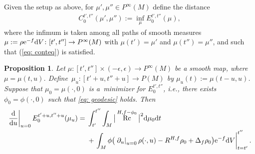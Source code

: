 \documentclass[pdftex]{sigma}
\numberwithin{equation}{section}
\newtheorem{prop}[thm]{Proposition}
 { \theoremstyle{definition}
\newtheorem{defn}[thm]{Definition}
\newtheorem{Note}[thm]{Note}
\newtheorem{Example}[thm]{Example}
\newtheorem{rmk}[thm]{Remark} }
\newcommand{\del}{\partial}
\newcommand{\eps}{\epsilon}
\DeclareMathOperator{\Rc}{Rc}
\begin{document}
Given the setup as above, for $\mu',\mu''\in P^\infty(M)$ define the distance
\begin{align*}
 C_0^{t',t''}(\mu',\mu''):=\inf_\mu E_0^{t',t''}(\mu),
\end{align*}
where the infimum is taken among all paths of smooth measures $\mu:=\rho {\rm e}^{-f} {\rm d}V\colon [t',t'']\to P^\infty(M)$ with $\mu(t')=\mu'$ and $\mu(t'')=\mu''$, and such that (\ref{eq: conteq}) is satisfied.

\begin{prop} \label{prop: cost}
	Let $\mu\colon[t',t'']\times (-\eps,\eps)\to P^\infty(M)$ be a smooth map, where $\mu=\mu(t,u)$. Define~${\mu_u\colon[t'+u,t''+u]\to P(M)}$ by $\mu_u(t):=\mu(t-u,u)$. Suppose that $\mu_0=\mu(\cdot,0)$ is a~minimizer for $E_0^{t',t''}$, i.e., there exists $\phi_0=\phi(\cdot,0)$ such that \eqref{eq: geodesic} holds. Then
	\begin{align*}
	\left. \frac{{\rm d}}{{\rm d}u} \right|_{u=0}E_0^{t'+u,t''+u}(\mu_u)={}
	&\int_{t'}^{t''}\int_M \big|\Rc^{H,f-\phi_0}\big|^2 {\rm d}\mu_0{\rm d}t \\
 &+\left. \int_M \phi\big(\left.\del_u\right|_{u=0}\rho(\cdot,u)-R^{H,f}\rho_0+\Delta_f \rho_0\big){\rm e}^{-f} {\rm d}V\right|_{t=t'}^{t''}.
	\end{align*}
\end{prop}
\end{document}
